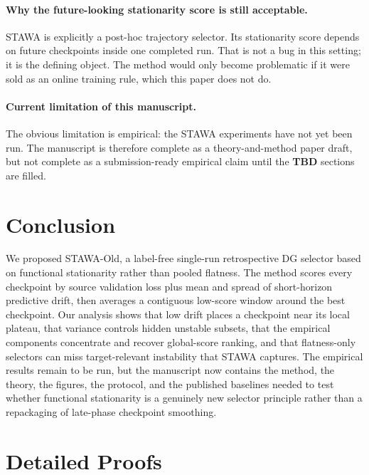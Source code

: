 \documentclass{article}
\newcommand{\TBD}{\textbf{TBD}}
\newcommand{\stawa}{\textup{\textsc{STAWA}}}
\begin{document}
\paragraph{Why the future-looking stationarity score is still acceptable.}
\stawa{} is explicitly a post-hoc trajectory selector. Its stationarity score depends on future checkpoints inside one completed run. That is not a bug in this setting; it is the defining object. The method would only become problematic if it were sold as an online training rule, which this paper does not do.

\paragraph{Current limitation of this manuscript.}
The obvious limitation is empirical: the \stawa{} experiments have not yet been run. The manuscript is therefore complete as a theory-and-method paper draft, but not complete as a submission-ready empirical claim until the \TBD{} sections are filled.

\section{Conclusion}

We proposed STAWA-Old, a label-free single-run retrospective DG selector based on functional stationarity rather than pooled flatness. The method scores every checkpoint by source validation loss plus mean and spread of short-horizon predictive drift, then averages a contiguous low-score window around the best checkpoint. Our analysis shows that low drift places a checkpoint near its local plateau, that variance controls hidden unstable subsets, that the empirical components concentrate and recover global-score ranking, and that flatness-only selectors can miss target-relevant instability that \stawa{} captures. The empirical results remain to be run, but the manuscript now contains the method, the theory, the figures, the protocol, and the published baselines needed to test whether functional stationarity is a genuinely new selector principle rather than a repackaging of late-phase checkpoint smoothing.




\appendix

\section{Detailed Proofs}
\end{document}
